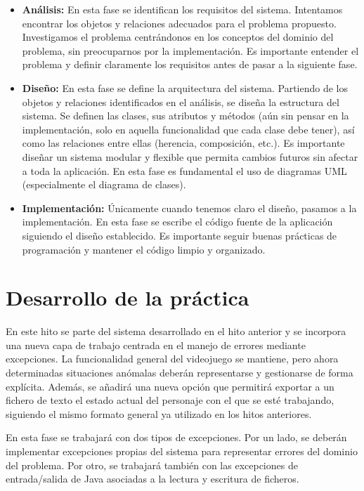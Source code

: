 \documentclass[11pt,a4paper]{article}
\begin{document}
\begin{itemize}
    \item \textbf{Análisis:} En esta fase se identifican los requisitos del sistema. Intentamos encontrar los objetos y relaciones adecuados para el problema propuesto. Investigamos el problema centrándonos en los conceptos del dominio del problema, sin preocuparnos por la implementación. Es importante entender el problema y definir claramente los requisitos antes de pasar a la siguiente fase.
    \item \textbf{Diseño:} En esta fase se define la arquitectura del sistema. Partiendo de los objetos y relaciones identificados en el análisis, se diseña la estructura del sistema. Se definen las clases, sus atributos y métodos (aún sin pensar en la implementación, solo en aquella funcionalidad que cada clase debe tener), así como las relaciones entre ellas (herencia, composición, etc.). Es importante diseñar un sistema modular y flexible que permita cambios futuros sin afectar a toda la aplicación. En esta fase es fundamental el uso de diagramas UML (especialmente el diagrama de clases).
    \item \textbf{Implementación:} Únicamente cuando tenemos claro el diseño, pasamos a la implementación. En esta fase se escribe el código fuente de la aplicación siguiendo el diseño establecido. Es importante seguir buenas prácticas de programación y mantener el código limpio y organizado.
\end{itemize}

\section{Desarrollo de la práctica}

En este hito se parte del sistema desarrollado en el hito anterior y se incorpora una nueva capa de trabajo centrada en el manejo de errores mediante excepciones. La funcionalidad general del videojuego se mantiene, pero ahora determinadas situaciones anómalas deberán representarse y gestionarse de forma explícita. Además, se añadirá una nueva opción que permitirá exportar a un fichero de texto el estado actual del personaje con el que se esté trabajando, siguiendo el mismo formato general ya utilizado en los hitos anteriores.

En esta fase se trabajará con dos tipos de excepciones. Por un lado, se deberán implementar excepciones propias del sistema para representar errores del dominio del problema. Por otro, se trabajará también con las excepciones de entrada/salida de Java asociadas a la lectura y escritura de ficheros.
\end{document}
